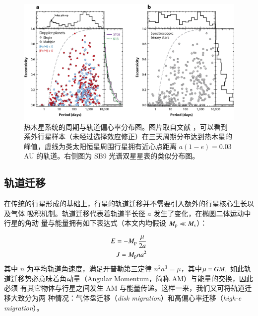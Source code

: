 \begin{figure}[t]
\centering
\includegraphics[width=1.0\textwidth]{figures/chapter4/fig3_peccdist.jpeg}
\caption[热木星系统的周期与轨道偏心率分布图。可以看到系外行星样本（未经过选择效应修正）在三天周期分布达到热木星的峰值，虚线为类太阳恒星周围行星拥有近心点距离 $a(1-e) = 0.03$ AU 的轨道。右侧图为 SB9 光谱双星星表的类似分布图，图片取自 Winn 和 Fabrycky。]{热木星系统的周期与轨道偏心率分布图。图片取自文献 ，可以看到系外行星样本（未经过选择效应修正）在三天周期分布达到热木星的峰值，虚线为类太阳恒星周围行星拥有近心点距离 $a(1-e) = 0.03$ AU 的轨道。右侧图为 SB9 光谱双星星表的类似分布图。}
\label{fig:hjperecc}
\end{figure}


\subsection{轨道迁移} \label{sec:migration}

在传统的行星形成的基础上，行星的轨道迁移并不需要引入额外的行星核心生长以及气体
吸积机制。轨道迁移代表着轨道半长径 $a$ 发生了变化，在椭圆二体运动中行星的角动
量与能量拥有如下表达式（本文内均假设 $M_\mathrm{p} \ll M_\mathrm{s}$）：

\begin{eqnarray}
E = - M_\mathrm{p} \, \frac{\mu}{2a} \\ \label{eq:2be}
J = M_\mathrm{p} n a^2 \label{eq:2bam}
\end{eqnarray} 
其中 $n$ 为平均轨道角速度，满足开普勒第三定律 $n^2a^3=\mu$，其中$\mu = G M_\mathrm{s}$
如此轨道迁移势必意味着角动量（Angular Momentum，简称 AM）与能量的交换，因此必须
有其它物体与行星之间发生 AM 与能量传递。这样一来，我们又可将轨道迁移大致分为两
种情况：气体盘迁移（\textit{disk migration}）和高偏心率迁移（\textit{high-e migration}）。

